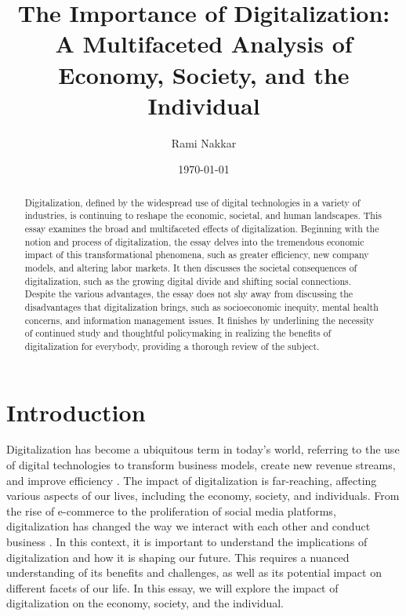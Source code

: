 \documentclass[12pt]{article}
\begin{document}
\onehalfspacing

\title{The Importance of Digitalization: A Multifaceted Analysis of Economy, Society, and the Individual}
\author{Rami Nakkar}
\date{\today}
\maketitle

\begin{abstract}
Digitalization, defined by the widespread use of digital technologies in a variety of industries, is continuing to reshape the economic, societal, and human landscapes. This essay examines the broad and multifaceted effects of digitalization. Beginning with the notion and process of digitalization, the essay delves into the tremendous economic impact of this transformational phenomena, such as greater efficiency, new company models, and altering labor markets. It then discusses the societal consequences of digitalization, such as the growing digital divide and shifting social connections.
Despite the various advantages, the essay does not shy away from discussing the disadvantages that digitalization brings, such as socioeconomic inequity, mental health concerns, and information management issues. It finishes by underlining the necessity of continued study and thoughtful policymaking in realizing the benefits of digitalization for everybody, providing a thorough review of the subject.
\end{abstract}

\newpage

\section{Introduction}
Digitalization has become a ubiquitous term in today's world, referring to the use of digital technologies to transform business models, create new revenue streams, and improve efficiency \cite{Gartner.5312023}. The impact of digitalization is far-reaching, affecting various aspects of our lives, including the economy, society, and individuals. From the rise of e-commerce to the proliferation of social media platforms, digitalization has changed the way we interact with each other and conduct business \cite{WillemvanWinden.2017}. In this context, it is important to understand the implications of digitalization and how it is shaping our future. This requires a nuanced understanding of its benefits and challenges, as well as its potential impact on different  facets of our life. In this essay, we will explore the impact of digitalization on the economy, society, and the individual.
\end{document}
